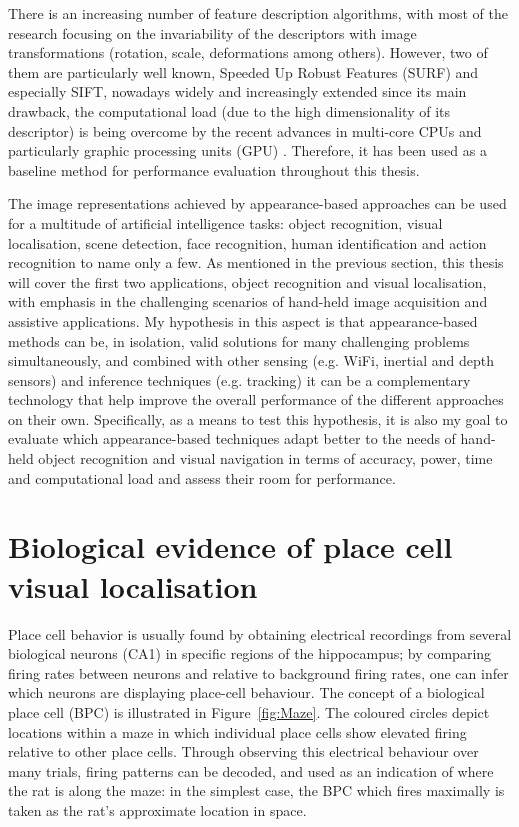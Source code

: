 There is an increasing number of feature description algorithms, with most of the research focusing on the invariability of the descriptors with image transformations (rotation, scale, deformations among others). However, two of them are particularly well known, Speeded Up Robust Features (SURF) and especially SIFT, nowadays widely and increasingly extended since its main drawback, the computational load (due to the high dimensionality of its descriptor) is being overcome by the recent advances in multi-core CPUs and particularly graphic processing units (GPU) \cite{Wu2007}. Therefore, it has been used as a baseline method for performance evaluation throughout this thesis.


The image representations achieved by appearance-based approaches can be used for a multitude of artificial intelligence tasks: object recognition, visual localisation, scene detection, face recognition, human identification and action recognition to name only a few. As mentioned in the previous section, this thesis will cover the first two applications, object recognition and visual localisation, with emphasis in the challenging scenarios of hand-held image acquisition and assistive applications. My hypothesis in this aspect is that appearance-based methods can be, in isolation, valid solutions for many challenging problems simultaneously, and combined with other sensing (e.g. WiFi, inertial and depth sensors) and inference techniques (e.g. tracking) it can be a complementary technology that help improve the overall performance of the different approaches on their own. Specifically, as a means to test this hypothesis, it is also my goal to evaluate which appearance-based techniques adapt better to the needs of hand-held object recognition and visual navigation in terms of accuracy, power, time and computational load and assess their room for performance.

\section{Biological evidence of place cell visual localisation} 

Place cell behavior is usually found by obtaining electrical recordings from several biological neurons (CA1) in specific regions of the hippocampus; by comparing firing rates between neurons and relative to background firing rates, one can infer which neurons are displaying place-cell behaviour. The concept of a biological place cell (BPC) is illustrated in Figure~\ref{fig:Maze}.  The coloured circles depict locations within a maze in which individual place cells show elevated firing relative to other place cells.  Through observing this electrical behaviour over many trials, firing patterns can be decoded, and used as an indication of where the rat is along the maze: in the simplest case, the BPC which fires maximally is taken as the rat's approximate location in space. \\

